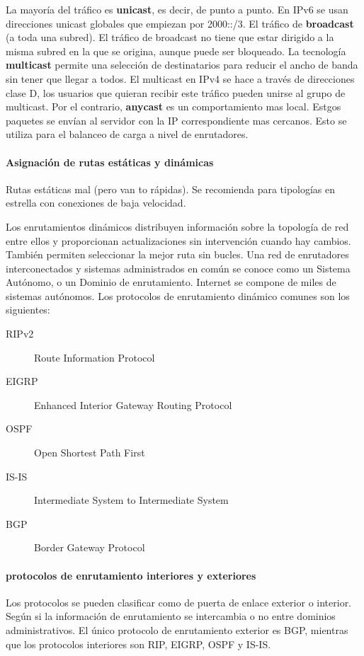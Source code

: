             La mayoría del tráfico es \textbf{unicast}, es decir, de punto a punto. En IPv6 se usan direcciones unicast globales que empiezan por 2000::/3. El tráfico de \textbf{broadcast} (a toda una subred). El tráfico de broadcast no tiene que estar dirigido a la misma subred en la que se origina, aunque puede ser bloqueado. La tecnología \textbf{multicast} permite una selección de destinatarios para reducir el ancho de banda sin tener que llegar a todos. El multicast en IPv4 se hace a través de direcciones clase D, los usuarios que quieran recibir este tráfico pueden unirse al grupo de multicast. Por el contrario, \textbf{anycast} es un comportamiento mas local. Estgos paquetes se envían al servidor con la IP correspondiente mas cercanos. Esto se utiliza para el balanceo de carga a nivel de enrutadores.

        \paragraph{Asignación de rutas estáticas y dinámicas}
            Rutas estáticas mal (pero van to rápidas). Se recomienda para tipologías en estrella con conexiones de baja velocidad.
            
            Los enrutamientos dinámicos distribuyen información sobre la topología de red entre ellos y proporcionan actualizaciones sin intervención cuando hay cambios. También permiten seleccionar la mejor ruta sin bucles. Una red de enrutadores interconectados y sistemas administrados en común se conoce como un Sistema Autónomo, o un Dominio de enrutamiento. Internet se compone de miles de sistemas autónomos. Los protocolos de enrutamiento dinámico comunes son los siguientes:
            \begin{description}
                \item[RIPv2] Route Information Protocol
                \item[EIGRP] Enhanced Interior Gateway Routing Protocol
                \item[OSPF] Open Shortest Path First
                \item[IS-IS] Intermediate System to Intermediate System
                \item[BGP] Border Gateway Protocol
            \end{description}
        \paragraph{protocolos de enrutamiento interiores y exteriores}
            Los protocolos se pueden clasificar como de puerta de enlace exterior o interior. Según si la información de enrutamiento se intercambia o no entre dominios administrativos. El único protocolo de enrutamiento exterior es BGP, mientras que los protocolos interiores son RIP, EIGRP, OSPF y IS-IS.

